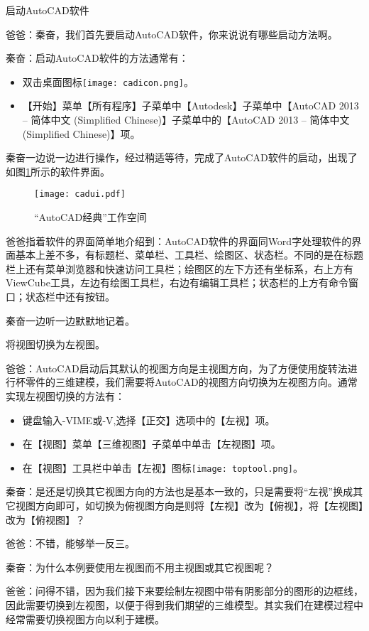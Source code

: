 \begin{procedure}

\item 启动AutoCAD软件

爸爸：秦奋，我们首先要启动AutoCAD软件，你来说说有哪些启动方法啊。

秦奋：启动AutoCAD软件的方法通常有：
\begin{itemize}
\item 双击桌面图标\texttt{[image: cadicon.png]}。
\item 【开始】菜单【所有程序】子菜单中【Autodesk】子菜单中【AutoCAD 2013 – 简体中文 (Simplified Chinese)】子菜单中的【AutoCAD 2013 – 简体中文 (Simplified Chinese)】项。
\end{itemize}
秦奋一边说一边进行操作，经过稍适等待，完成了AutoCAD软件的启动，出现了如图\ref{fig:cadui}所示的软件界面。
\noindent
\begin{figure}[htbp]
\centering
\texttt{[image: cadui.pdf]}
\caption{“AutoCAD经典”工作空间}\label{fig:cadui}
\end{figure}
爸爸指着软件的界面简单地介绍到：AutoCAD软件的界面同Word字处理软件的界面基本上差不多，有标题栏、菜单栏、工具栏、绘图区、状态栏。不同的是在标题栏上还有菜单浏览器和快速访问工具栏；绘图区的左下方还有坐标系，右上方有ViewCube工具，左边有绘图工具栏，右边有编辑工具栏；状态栏的上方有命令窗口；状态栏中还有按钮。

秦奋一边听一边默默地记着。
\item 将视图切换为左视图。

爸爸：AutoCAD启动后其默认的视图方向是主视图方向，为了方便使用旋转法进行杯零件的三维建模，我们需要将AutoCAD的视图方向切换为左视图方向。通常实现左视图切换的方法有：
\begin{itemize}
\item 键盘输入-VIME或-V,选择【正交】选项中的【左视】项。
\item 在【视图】菜单【三维视图】子菜单中单击【左视图】项。
\item 在【视图】工具栏中单击【左视】图标\texttt{[image: toptool.png]}。
\end{itemize}
秦奋：是还是切换其它视图方向的方法也是基本一致的，只是需要将“左视”换成其它视图方向即可，如切换为俯视图方向是则将【左视】改为【俯视】，将【左视图】改为【俯视图】？

爸爸：不错，能够举一反三。

秦奋：为什么本例要使用左视图而不用主视图或其它视图呢？

爸爸：问得不错，因为我们接下来要绘制左视图中带有阴影部分的图形的边框线，因此需要切换到左视图，以便于得到我们期望的三维模型。其实我们在建模过程中经常需要切换视图方向以利于建模。


\end{procedure}
